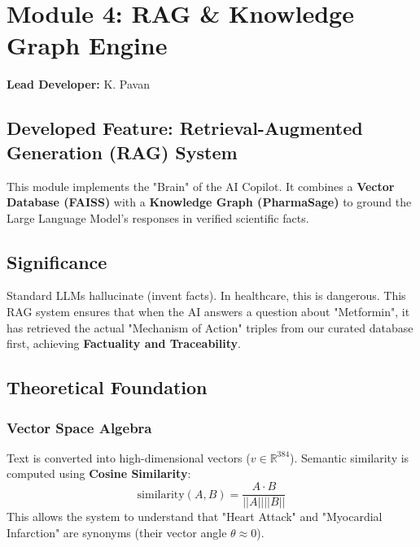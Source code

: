 \documentclass[a4paper,12pt]{report}
\begin{document}
\newpage

\chapter{Module 4: RAG & Knowledge Graph Engine}
\textbf{Lead Developer:} K. Pavan

\section{Developed Feature: Retrieval-Augmented Generation (RAG) System}
This module implements the "Brain" of the AI Copilot. It combines a \textbf{Vector Database (FAISS)} with a \textbf{Knowledge Graph (PharmaSage)} to ground the Large Language Model's responses in verified scientific facts.

\section{Significance}
Standard LLMs hallucinate (invent facts). In healthcare, this is dangerous. This RAG system ensures that when the AI answers a question about "Metformin", it has retrieved the actual "Mechanism of Action" triples from our curated database first, achieving \textbf{Factuality and Traceability}.

\section{Theoretical Foundation}
\subsection{Vector Space Algebra}
Text is converted into high-dimensional vectors ($v \in \mathbb{R}^{384}$). Semantic similarity is computed using \textbf{Cosine Similarity}:
$$ \text{similarity}(A, B) = \frac{A \cdot B}{||A|| ||B||} $$
This allows the system to understand that "Heart Attack" and "Myocardial Infarction" are synonyms (their vector angle $\theta \approx 0$).
\end{document}
